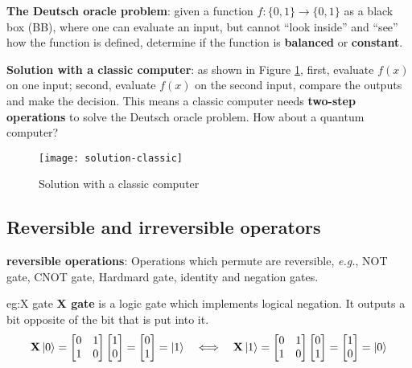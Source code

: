 \documentclass{easyclass}
\begin{document}
\textbf{The Deutsch oracle problem}: given a function $f:\{0,1\}\rightarrow \{0,1\}$ as a black box (BB), where one can evaluate an input, but cannot ``look inside'' and ``see'' how the function is defined, determine if the function is \textbf{balanced} or \textbf{constant}. 

\textbf{Solution with a classic computer}: as shown in Figure \ref{fig:solution with a classic computer}, first, evaluate $f(x)$ on one input; second, evaluate $f(x)$ on the second input, compare the outputs and make the decision. This means a classic computer needs \textbf{two-step operations} to solve the Deutsch oracle problem. How about a quantum computer?

\begin{figure}[h]
	\centering
	\texttt{[image: solution-classic]}
	\caption{Solution with a classic computer}
	\label{fig:solution with a classic computer}
\end{figure}

\subsection{Reversible and irreversible operators}

\textbf{reversible operations}: Operations which permute are reversible, \textit{e.g.}, NOT gate, CNOT gate, Hardmard gate, identity and negation gates.

\begin{example}{eg:X gate}
	\textbf{X gate} is a logic gate which implements logical negation. It outputs a bit opposite of the bit that is put into it. 
	\begin{equation}
			\mathbf{X}\ket{0}=
			\begin{bmatrix}
				0 & 1\\
				1 & 0
			\end{bmatrix} 
			\begin{bmatrix}
				1 \\ 0
			\end{bmatrix}=
			\begin{bmatrix}
				0 \\ 1
			\end{bmatrix}=\ket{1}
			\quad\Longleftrightarrow\quad
			\mathbf{X}\ket{1}=
			\begin{bmatrix}
				0 & 1\\
				1 & 0
			\end{bmatrix} 
			\begin{bmatrix}
				0 \\ 1
			\end{bmatrix}=
			\begin{bmatrix}
				1 \\ 0
			\end{bmatrix}=\ket{0}
	\end{equation}
\end{example}
\end{document}
